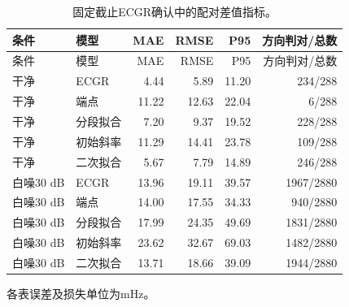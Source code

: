 \small
\begin{longtable}{llrrrr}
\caption{固定截止ECGR确认中的配对差值指标。}\\
\toprule
条件 & 模型 & MAE & RMSE & P95 & 方向判对/总数 \\
\midrule
\endfirsthead
\toprule
条件 & 模型 & MAE & RMSE & P95 & 方向判对/总数 \\
\midrule
\endhead
干净 & ECGR & 4.44 & 5.89 & 11.20 & 234/288 \\
干净 & 端点 & 11.22 & 12.63 & 22.04 & 6/288 \\
干净 & 分段拟合 & 7.20 & 9.37 & 19.52 & 228/288 \\
干净 & 初始斜率 & 11.29 & 14.41 & 23.78 & 109/288 \\
干净 & 二次拟合 & 5.67 & 7.79 & 14.89 & 246/288 \\
白噪30 dB & ECGR & 13.96 & 19.11 & 39.57 & 1967/2880 \\
白噪30 dB & 端点 & 14.00 & 17.55 & 34.33 & 940/2880 \\
白噪30 dB & 分段拟合 & 17.99 & 24.35 & 49.69 & 1831/2880 \\
白噪30 dB & 初始斜率 & 23.62 & 32.67 & 69.03 & 1482/2880 \\
白噪30 dB & 二次拟合 & 13.71 & 18.66 & 39.09 & 1944/2880 \\
\bottomrule
\end{longtable}
\normalsize 各表误差及损失单位为mHz。
